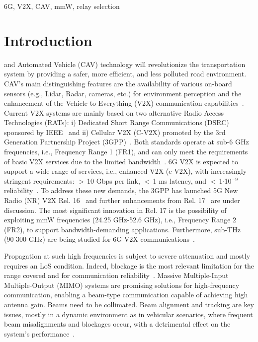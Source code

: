 \documentclass[journal]{IEEEtran}
\begin{document}
\begin{IEEEkeywords}
6G, V2X, CAV, mmW, relay selection 
\end{IEEEkeywords}

\IEEEpeerreviewmaketitle

\section{Introduction}

 and Automated Vehicle (CAV) technology will revolutionize the transportation system by providing a safer, more efficient, and less polluted road environment. CAV's main distinguishing features are the availability of various on-board sensors (e.g., Lidar, Radar, cameras, etc.) for environment perception and the enhancement of the Vehicle-to-Everything (V2X) communication capabilities~\cite{Sartori, Iwashina8300313, survey_aut_drive}. 
Current V2X systems are mainly based on two alternative Radio Access Technologies (RATs): i) Dedicated Short Range Communications (DSRC) sponsored by IEEE~\cite{TVT_dsrc} and ii) Cellular V2X (C-V2X) promoted by the 3rd Generation Partnership Project (3GPP)~\cite{Sepulcre8691973}. Both standards operate at sub-6 GHz frequencies, i.e., Frequency Range 1 (FR1), and can only meet the requirements of basic V2X services due to the limited  bandwidth~\cite{3GPP_5Greq2020}. 6G V2X is expected to support a wide range of services, i.e., enhanced-V2X (e-V2X), with increasingly stringent requirements: $>\,$10 Gbps per link, $<\,$1 ms latency, and $<\,$1$\cdot$10$^{-9}$ reliability~\cite{6g}. To address these new demands, the 3GPP has launched 5G New Radio (NR) V2X Rel. 16~\cite{TR22886} and further enhancements from Rel. 17~\cite{rel17} are under discussion. The most significant innovation in Rel. 17 is the possibility of exploiting mmW frequencies (24.25 GHz-52.6 GHz), i.e., Frequency Range 2 (FR2), to support bandwidth-demanding applications. Furthermore, sub-THz (90-300 GHz) are being studied for 6G V2X communications~\cite{Gozalvez8369031, Gozalvez8887840}. 

Propagation at such high frequencies is subject to severe attenuation and mostly requires an LoS condition. Indeed, blockage is the most relevant limitation for the range covered and for communication reliability~\cite{TVT_mmw, v2v_multihop_mmwave}. Massive Multiple-Input Multiple-Output (MIMO) systems are promising solutions for high-frequency communication, enabling a beam-type communication capable of achieving high antenna gain. Beams need to be collimated. Beam alignment and tracking are key issues, mostly in a dynamic environment as in vehicular scenarios, where frequent beam misalignments and blockages occur, with a detrimental effect on the system's performance~\cite{Rappaport:J13}. 
\end{document}
